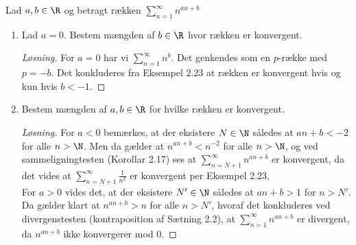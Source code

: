 \begin{opg}
	Lad $ a,b\in\R $ og betragt rækken $ \displaystyle\sum_{n=1}^{\infty}n^{an+b} $
	\begin{enumerate}
		\item Lad $ a=0 $. Bestem m\ae{}ngden af  $ b\in\R $ hvor rækken er konvergent.
		\ifanswers
		\begin{proof}[Løsning]
			For $ a=0 $ har vi $ \sum_{n=1}^{\infty}n^b $. Det genkendes som en $ p $-række med $ p=-b $. Det konkluderes fra Eksempel 2.23 at rækken er konvergent hvis og kun hvis $ b<-1 $.
		\end{proof}
		\fi
		\item Bestem m\ae{}ngden af  $ a,b\in\R $ for hvilke rækken er konvergent.
		\ifanswers
		\begin{proof}[Løsning]
			For $ a<0 $ bemærkes, at der eksistere $ N\in\N $ således at $ an+b<-2 $ for alle $ n>\N $. Men da gælder at $ n^{an+b}<n^{-2} $ for alle $ n>\N $, og ved sammeligningtesten (Korollar 2.17) ses at $ \sum_{n=N+1}^{\infty}n^{an+b} $ er konvergent, da det vides at $ \sum_{n=N+1}^{\infty}\frac{1}{n^2} $ er konvergent per Eksempel 2.23,\\
			For $ a>0 $ vides det, at der eksistere $ N'\in\N $ således at $ an+b>1 $ for $ n>N' $. Da gælder klart at $ n^{an+b}>n $ for alle $ n>N' $, hvoraf det konkluderes ved divergenstesten (kontraposition af Sætning 2.2), at $ \sum_{n=1}^{\infty}n^{an+b} $ er divergent, da $ n^{an+b} $ ikke konvergerer mod $ 0 $.
			

\end{proof}
\end{enumerate}
\end{opg}
